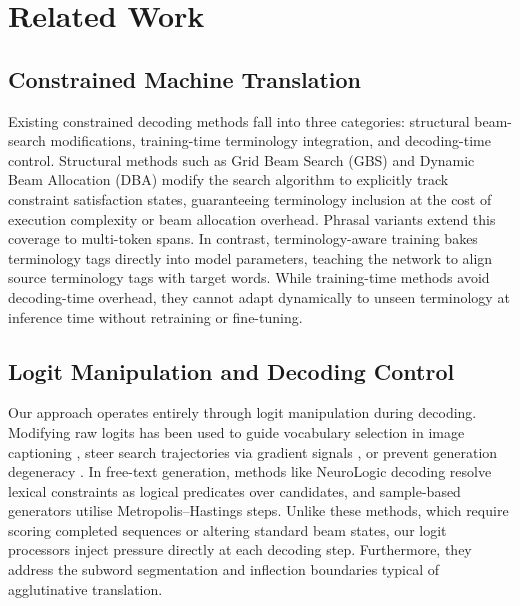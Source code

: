\documentclass{CUP-JNL-NLP}
\begin{document}
\section{Related Work}

\subsection{Constrained Machine Translation}

Existing constrained decoding methods fall into three categories: structural
beam-search modifications, training-time terminology integration, and decoding-time
control. Structural methods such as Grid Beam Search (GBS)
\citep{hokamp2017lexically} and Dynamic Beam Allocation (DBA) \citep{post2018fast}
modify the search algorithm to explicitly track constraint satisfaction states,
guaranteeing terminology inclusion at the cost of execution complexity or beam
allocation overhead. Phrasal variants \citep{hu2019improved} extend this coverage
to multi-token spans. In contrast, terminology-aware training \citep{dinu2019training}
bakes terminology tags directly into model parameters, teaching the network to align
source terminology tags with target words. While training-time methods avoid
decoding-time overhead, they cannot adapt dynamically to unseen terminology at
inference time without retraining or fine-tuning.

\subsection{Logit Manipulation and Decoding Control}

Our approach operates entirely through logit manipulation during decoding. Modifying
raw logits has been used to guide vocabulary selection in image captioning
\citep{anderson2017guided}, steer search trajectories via gradient signals
\citep{sha2020gradient}, or prevent generation degeneracy \citep{holtzman2020curious}.
In free-text generation, methods like NeuroLogic decoding \citep{lu2021neurologic}
resolve lexical constraints as logical predicates over candidates, and sample-based
generators \citep{miao2019cgmh} utilise Metropolis--Hastings steps. Unlike these
methods, which require scoring completed sequences or altering standard beam states,
our logit processors inject pressure directly at each decoding step. Furthermore,
they address the subword segmentation and inflection boundaries typical of
agglutinative translation.
\end{document}
